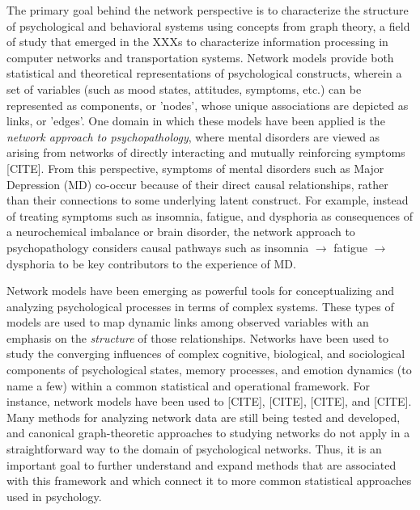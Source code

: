 The primary goal behind the network perspective is to characterize the structure of psychological and behavioral systems using concepts from graph theory, a field of study that emerged in the XXXs to characterize information processing in computer networks and transportation systems. Network models provide both statistical and theoretical representations of psychological constructs, wherein a set of variables (such as mood states, attitudes, symptoms, etc.) can be represented as components, or 'nodes', whose unique associations are depicted as links, or 'edges'. One domain in which these models have been applied is the \textit{network approach to psychopathology}, where mental disorders are viewed as arising from networks of directly interacting and mutually reinforcing symptoms [CITE]. From this perspective, symptoms of mental disorders such as Major Depression (MD) co-occur because of their direct causal relationships, rather than their connections to some underlying latent construct. For example, instead of treating symptoms such as insomnia, fatigue, and dysphoria as consequences of a neurochemical imbalance or brain disorder, the network approach to psychopathology considers causal pathways such as insomnia $\rightarrow$ fatigue $\rightarrow$ dysphoria to be key contributors to the experience of MD. 

Network models have been emerging as powerful tools for conceptualizing and analyzing psychological processes in terms of complex systems. These types of models are used to map dynamic links among observed variables with an emphasis on the \textit{structure} of those relationships. Networks have been used to study the converging influences of complex cognitive, biological, and sociological components of psychological states, memory processes, and emotion dynamics (to name a few) within a common statistical and operational framework. For instance, network models have been used to [CITE], [CITE], [CITE], and [CITE]. Many methods for analyzing network data are still being tested and developed, and canonical graph-theoretic approaches to studying networks do not apply in a straightforward way to the domain of psychological networks. Thus, it is an important goal to further understand and expand methods that are associated with this framework and which connect it to more common statistical approaches used in psychology. 

